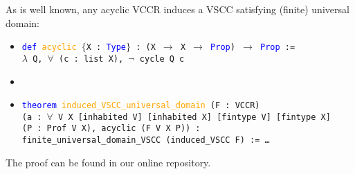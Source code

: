 \documentclass[runningheads]{llncs}
\begin{document}
As is well known, any acyclic VCCR induces a VSCC satisfying (finite) universal domain:
\begin{itemize}
\item[] \texttt{\textcolor{blue}{def} \textcolor{orange}{acyclic} $\{$X : \textcolor{blue}{Type}$\}$ : (X $\to$ X $\to$ \textcolor{blue}{Prop}) $\to$ \textcolor{blue}{Prop} :=}\\
\texttt{$\lambda$ Q, $\forall$ (c : list X), $\neg$ cycle Q c}
\item[]
\item[] \texttt{\textcolor{blue}{theorem} \textcolor{orange}{induced\_VSCC\_universal\_domain} (F : VCCR)}\\
\texttt{(a : $\forall$ V X [inhabited V] [inhabited X] [fintype V] [fintype X]} \\
\texttt{(P : Prof V X), acyclic (F V X P)) :}\\
\texttt{finite\_universal\_domain\_VSCC (induced\_VSCC F) := \dots}
\end{itemize}
The proof can be found in our online repository.





\begin{comment}
\whnote{Let's think about how to formalize the following...}

\begin{definition} \textnormal{Given $X\subseteq\mathcal{X}$, a \textit{choice function on $X$} is a function that assigns to each nonempty $Y\subseteq X$ a nonempty $C(Y)\subseteq Y$.}
\end{definition}

\begin{definition}\textnormal{For $V\subseteq\mathcal{V}$ and $X\subseteq\mathcal{X}$, a \textit{functional collective choice rule for $(V,X)$}, or \textit{$(V,X)$-FCCR}, is a function $\mathbb{F}$ that assigns to each $\mathbf{Q}\in  \mathsf{Prof}(V,X)$ a choice function on $X$.}\end{definition}

\begin{definition}\label{VCCR} \textnormal{A \emph{variable-election functional collective choice rule} (VFCCR) is a function $f$ that assigns to each pair $(V,X)$ of a $V\subseteq\mathcal{V}$ and $X\subseteq\mathcal{X}$ a $(V,X)$-FCCR.}%
\end{definition}
\end{comment}
\end{document}
